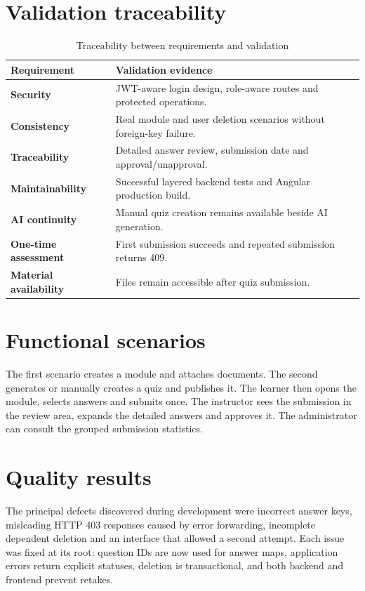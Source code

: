 \section{Validation traceability}
\begin{table}[H]\centering
\caption{Traceability between requirements and validation}
\label{tab:traceability}
\begin{tabularx}{\textwidth}{>{\bfseries}p{}X}
\toprule Requirement & Validation evidence\\\midrule
Security & JWT-aware login design, role-aware routes and protected operations.\\
Consistency & Real module and user deletion scenarios without foreign-key failure.\\
Traceability & Detailed answer review, submission date and approval/unapproval.\\
Maintainability & Successful layered backend tests and Angular production build.\\
AI continuity & Manual quiz creation remains available beside AI generation.\\
One-time assessment & First submission succeeds and repeated submission returns 409.\\
Material availability & Files remain accessible after quiz submission.\\
\bottomrule
\end{tabularx}
\end{table}

\section{Functional scenarios}
The first scenario creates a module and attaches documents. The second
generates or manually creates a quiz and publishes it. The learner then opens
the module, selects answers and submits once. The instructor sees the
submission in the review area, expands the detailed answers and approves it.
The administrator can consult the grouped submission statistics.

\section{Quality results}
The principal defects discovered during development were incorrect answer
keys, misleading HTTP 403 responses caused by error forwarding, incomplete
dependent deletion and an interface that allowed a second attempt. Each issue
was fixed at its root: question IDs are now used for answer maps, application
errors return explicit statuses, deletion is transactional, and both backend
and frontend prevent retakes.

